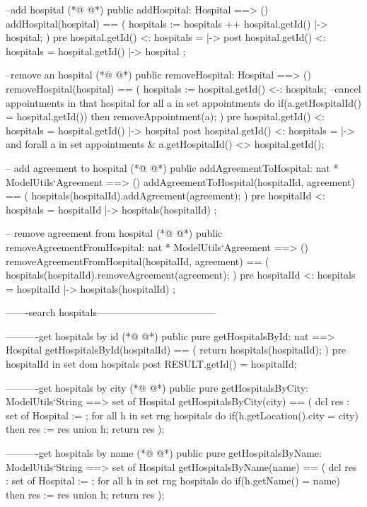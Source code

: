 \begin{vdmpp}[breaklines=true]
  
   --add hospital
(*@
\label{addHospital:59}
@*)
  public addHospital: Hospital ==> ()
  addHospital(hospital) == (
   hospitals := hospitals ++  { hospital.getId() |-> hospital};
  )
  pre {hospital.getId() } <: hospitals = { |-> } 
  post {hospital.getId() } <: hospitals = { hospital.getId() |-> hospital } ;
  
  --remove an hospital
(*@
\label{removeHospital:67}
@*)
  public removeHospital: Hospital ==> ()
  removeHospital(hospital) == (   
   hospitals := {hospital.getId()} <-: hospitals;
   --cancel appointments in that hospital
   for all a in set appointments do 
    if(a.getHospitalId() = hospital.getId()) then
     removeAppointment(a);
  )
   pre {hospital.getId()} <: hospitals = { hospital.getId() |-> hospital } 
  post {hospital.getId()} <: hospitals = { |-> } and 
     forall a in set appointments & a.getHospitalId() <> hospital.getId();
  
  -- add agreement to hospital
(*@
\label{addAgreementToHospital:80}
@*)
  public addAgreementToHospital: nat * ModelUtils`Agreement ==> ()
  addAgreementToHospital(hospitalId, agreement) == (
   hospitals(hospitalId).addAgreement(agreement);
  )
  pre {hospitalId} <: hospitals = { hospitalId |-> hospitals(hospitalId) };
  

  -- remove agreement from hospital
(*@
\label{removeAgreementFromHospital:88}
@*)
  public removeAgreementFromHospital: nat * ModelUtils`Agreement ==> ()
  removeAgreementFromHospital(hospitalId, agreement) == (
   hospitals(hospitalId).removeAgreement(agreement);
  )
  pre {hospitalId} <: hospitals = { hospitalId |-> hospitals(hospitalId) };
  
  -------search hospitals------------------------------------
 
  ----------get hospitals by id
(*@
\label{getHospitalsById:97}
@*)
  public pure getHospitalsById: nat ==> Hospital
   getHospitalsById(hospitalId) == (
    return hospitals(hospitalId);
   )
  pre hospitalId in set dom hospitals
  post RESULT.getId() = hospitalId;
   
  ----------get hospitals by city
(*@
\label{getHospitalsByCity:105}
@*)
  public pure getHospitalsByCity: ModelUtils`String ==> set of Hospital
   getHospitalsByCity(city) == (
    dcl res : set of Hospital := {};
    for all h in set rng hospitals do
      if(h.getLocation().city = city) then
       res := res union {h};
    return res
   );
  
  ----------get hospitals by name
(*@
\label{getHospitalsByName:115}
@*)
  public pure getHospitalsByName: ModelUtils`String ==> set of Hospital
   getHospitalsByName(name) == (
    dcl res : set of Hospital := {};
    for all h in set rng hospitals do
      if(h.getName() = name) then
       res := res union {h};
    return res
   );
  

\end{vdmpp}
